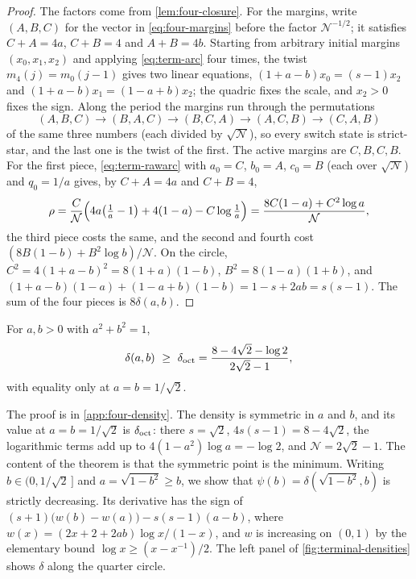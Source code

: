 \begin{proof}
The factors come from \cref{lem:four-closure}. For the margins, write $(A,B,C)$ for the vector in
\eqref{eq:four-margins} before the factor $\mathcal N^{-1/2}$; it satisfies $C+A=4a$, $C+B=4$ and
$A+B=4b$. Starting from arbitrary initial margins $(x_0,x_1,x_2)$ and applying
\eqref{eq:term-arc} four times, the twist $m_4(j)=m_0(j-1)$ gives two linear equations,
$(1+a-b)x_0=(s-1)x_2$ and $(1+a-b)x_1=(1-a+b)x_2$; the quadric fixes the scale, and $x_2>0$ fixes
the sign. Along the period the margins run through the permutations
\[
 (A,B,C)\to(B,A,C)\to(B,C,A)\to(A,C,B)\to(C,A,B)
\]
of the same three numbers (each divided by $\sqrt{\mathcal N}$), so every switch state is
strict-star, and the last one is the twist of the first. The active margins are $C,B,C,B$. For
the first piece, \eqref{eq:term-rawarc} with $a_0=C$, $b_0=A$, $c_0=B$ (each over
$\sqrt{\mathcal N}$) and $q_0=1/a$ gives, by $C+A=4a$ and $C+B=4$,
\[
 \rho=\frac{C}{\mathcal N}\Bigl(4a\bigl(\tfrac1a-1\bigr)+4(1-a)-C\log\tfrac1a\Bigr)
 =\frac{8C(1-a)+C^2\log a}{\mathcal N},
\]
the third piece costs the same, and the second and fourth cost $(8B(1-b)+B^2\log b)/\mathcal N$.
On the circle, $C^2=4(1+a-b)^2=8(1+a)(1-b)$, $B^2=8(1-a)(1+b)$, and
$(1+a-b)(1-a)+(1-a+b)(1-b)=1-s+2ab=s(s-1)$. The sum of the four pieces is $8\delta(a,b)$.
\end{proof}

\begin{theorem}\label{thm:four-density}
For $a,b>0$ with $a^2+b^2=1$,
\[
 \delta(a,b)\ \ge\ \doct=\frac{8-4\sqrt2-\log2}{2\sqrt2-1},
\]
with equality only at $a=b=1/\sqrt2$.
\end{theorem}

The proof is in \cref{app:four-density}. The density is symmetric in $a$ and $b$, and its value
at $a=b=1/\sqrt2$ is $\delta_{\mathrm{oct}}$: there $s=\sqrt2$, $4s(s-1)=8-4\sqrt2$, the logarithmic terms add
up to $4(1-a^2)\log a=-\log 2$, and $\mathcal N=2\sqrt2-1$. The content of the theorem is that
the symmetric point is the minimum. Writing $b\in(0,1/\sqrt2\,]$ and $a=\sqrt{1-b^2}\ge b$, we
show that $\psi(b)=\delta(\sqrt{1-b^2},b)$ is strictly decreasing. Its derivative has the sign
of $(s+1)\bigl(w(b)-w(a)\bigr)-s(s-1)(a-b)$, where $w(x)=(2x+2+2ab)\log x/(1-x)$, and $w$ is
increasing on $(0,1)$ by the elementary bound $\log x\ge(x-x^{-1})/2$. The left panel of
\cref{fig:terminal-densities} shows $\delta$ along the quarter circle.

